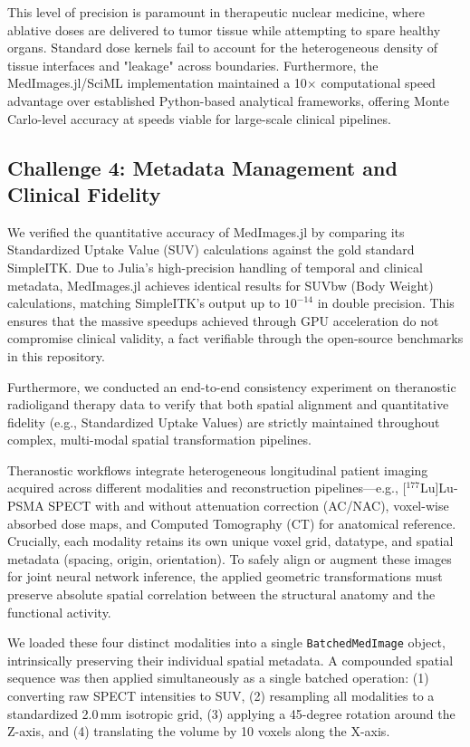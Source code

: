 \documentclass[10pt,letterpaper]{article}
\begin{document}
This level of precision is paramount in therapeutic nuclear medicine, where ablative doses are delivered to tumor tissue while attempting to spare healthy organs. Standard dose kernels fail to account for the heterogeneous density of tissue interfaces and "leakage" across boundaries. Furthermore, the MedImages.jl/SciML implementation maintained a 10$\times$ computational speed advantage over established Python-based analytical frameworks, offering Monte Carlo-level accuracy at speeds viable for large-scale clinical pipelines.

\subsection*{Challenge 4: Metadata Management and Clinical Fidelity}
We verified the quantitative accuracy of MedImages.jl by comparing its Standardized Uptake Value (SUV) calculations against the gold standard SimpleITK. Due to Julia's high-precision handling of temporal and clinical metadata, MedImages.jl achieves identical results for SUVbw (Body Weight) calculations, matching SimpleITK's output up to $10^{-14}$ in double precision. This ensures that the massive speedups achieved through GPU acceleration do not compromise clinical validity, a fact verifiable through the open-source benchmarks in this repository.

Furthermore, we conducted an end-to-end consistency experiment on theranostic radioligand therapy data to verify that both spatial alignment and quantitative fidelity (e.g., Standardized Uptake Values) are strictly maintained throughout complex, multi-modal spatial transformation pipelines.

Theranostic workflows integrate heterogeneous longitudinal patient imaging acquired across different modalities and reconstruction pipelines---e.g., [$^{177}$Lu]Lu-PSMA SPECT with and without attenuation correction (AC/NAC), voxel-wise absorbed dose maps, and Computed Tomography (CT) for anatomical reference. Crucially, each modality retains its own unique voxel grid, datatype, and spatial metadata (spacing, origin, orientation). To safely align or augment these images for joint neural network inference, the applied geometric transformations must preserve absolute spatial correlation between the structural anatomy and the functional activity.

We loaded these four distinct modalities into a single \texttt{BatchedMedImage} object, intrinsically preserving their individual spatial metadata. A compounded spatial sequence was then applied simultaneously as a single batched operation: (1) converting raw SPECT intensities to SUV, (2) resampling all modalities to a standardized 2.0\,mm isotropic grid, (3) applying a 45-degree rotation around the Z-axis, and (4) translating the volume by 10 voxels along the X-axis.
\end{document}
